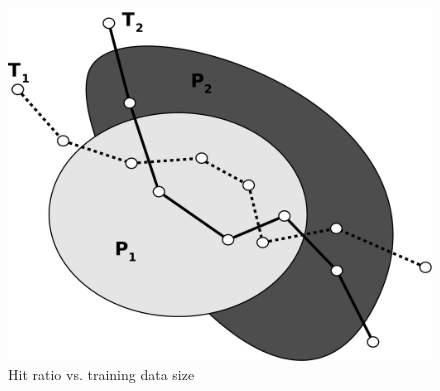 \begin{figure}[htb]
\center
     \includegraphics[width=0.5\columnwidth]{figures/poiIntersect.pdf}
\caption{ Hit ratio vs. training data size}
\label{fig:dataSizeVsHitRatio}
\end{figure}

